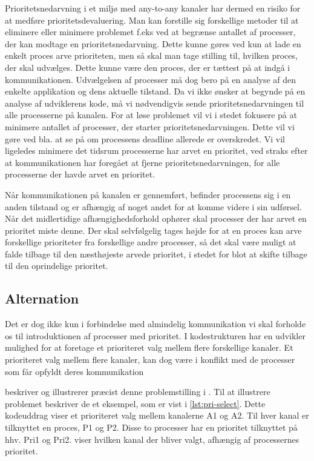 Prioritetsnedarvning i et miljø med any-to-any kanaler har dermed en risiko for at medføre prioritetsdevaluering. Man kan forstille sig forskellige metoder til at eliminere eller minimere problemet f.eks ved at begrænse antallet af processer, der kan modtage en prioritetsnedarvning. Dette kunne gøres ved kun at lade en enkelt proces arve prioriteten,  men så skal man tage stilling til, hvilken proces, der skal udvælges. Dette kunne være den proces, der er tættest på at indgå i kommunikationen.  Udvælgelsen af processer må dog bero på en analyse af den enkelte applikation og dens aktuelle tilstand. Da vi ikke ønsker at begynde på en analyse af udviklerens kode, må vi nødvendigvis sende prioritetsnedarvningen til alle processerne på kanalen. For at løse problemet vil vi i stedet fokusere på at minimere antallet af processer, der starter prioritetsnedarvningen. Dette vil vi gøre ved bla. at se på om processens deadline allerede er overskredet. Vi vil ligeledes minimere det tidsrum processerne har arvet en prioritet, ved straks efter at kommunikationen har foregået at fjerne prioritetsnedarvningen, for alle processerne der havde arvet en prioritet.

Når kommunikationen på kanalen er gennemført, befinder processens sig i en anden tilstand og er afhængig af noget andet for at komme videre i sin udførsel. 
Når det midlertidige afhængighedsforhold ophører skal processer der har arvet en prioritet miste denne. Der skal selvfølgelig tages højde for at en proces kan arve forskellige prioriteter fra forskellige andre processer, så det skal være muligt at falde tilbage til den næsthøjeste arvede prioritet, i stedet for blot at skifte tilbage til den oprindelige prioritet. 

\subsection{Alternation}\label{misc:kanal-prioritet}
Det er dog ikke kun i forbindelse med almindelig kommunikation vi skal forholde os til introduktionen af processer med prioritet. I kodestrukturen 
har en udvikler mulighed for at foretage et  prioriteret valg mellem flere forskellige kanaler. Et prioriteret valg mellem flere kanaler, kan dog være i konflikt med de processer som får opfyldt deres kommunikation
  
\citeauthor{Burns1990} beskriver og illustrerer præcist denne problemstilling i \cite{Burns1990}. Til at illustrere problemet beskriver de et eksempel, som er vist i \cref{lst:pri-select}. Dette kodeuddrag viser et prioriteret valg mellem kanalerne A1 og A2. Til hver kanal er tilknyttet en proces, P1 og P2. Disse to processer har en prioritet tilknyttet på hhv.  Pri1 og Pri2.  viser hvilken kanal der bliver valgt, afhængig af processernes prioritet.

